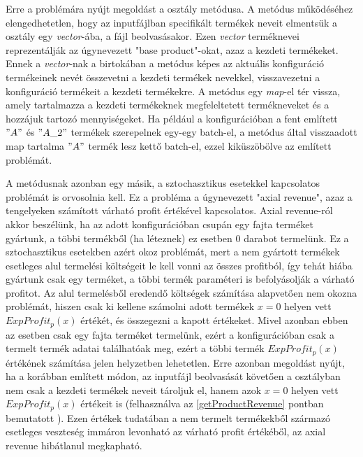 Erre a problémára nyújt megoldást a  osztály  metódusa.
A metódus működéséhez elengedhetetlen, hogy az inputfájlban specifikált termékek neveit elmentsük a  osztály egy \textit{vector}-ába, a fájl beolvasásakor.
Ezen \textit{vector} terméknevei reprezentálják az úgynevezett "base product"-okat, azaz a kezdeti termékeket.
Ennek a \textit{vector}-nak a birtokában a  metódus képes az aktuális konfiguráció termékeinek nevét összevetni a kezdeti termékek nevekkel, visszavezetni a konfiguráció termékeit a kezdeti termékekre.
A metódus egy \textit{map}-el tér vissza, amely tartalmazza a kezdeti termékeknek megfeleltetett termékneveket és a hozzájuk tartozó mennyiségeket.
Ha például a konfigurációban a fent említett $"A"$ és $"A\_2"$ termékek szerepelnek egy-egy batch-el, a metódus által visszaadott map tartalma $"A"$ termék lesz kettő batch-el, ezzel kiküszöbölve az említett problémát.

A  metódusnak azonban egy másik, a sztochasztikus esetekkel kapcsolatos problémát is orvosolnia kell.
Ez a probléma a úgynevezett "axial revenue", azaz a tengelyeken számított várható profit értékével kapcsolatos.
Axial revenue-ról akkor beszélünk, ha az adott konfigurációban csupán egy fajta terméket gyártunk, a többi termékből (ha léteznek) ez esetben 0 darabot termelünk.
Ez a sztochasztikus esetekben azért okoz problémát, mert a nem gyártott termékek esetleges alul termelési költségeit le kell vonni az összes profitból, így tehát hiába gyártunk csak egy terméket, a többi termék paraméteri is befolyásolják a várható profitot.
Az alul termelésből eredendő költségek számítása alapvetően nem okozna problémát, hiszen csak ki kellene számolni adott termékek $x=0$ helyen vett $ExpProfit_p(x)$ értékét, és összegezni a kapott értékeket.
Mivel azonban ebben az esetben csak egy fajta terméket termelünk, ezért a konfigurációban csak a termelt termék adatai találhatóak meg, ezért a többi termék $ExpProfit_p(x)$ értékének számítása jelen helyzetben lehetetlen.
Erre azonban megoldást nyújt, ha a korábban említett módon, az inputfájl beolvasását követően a  osztályban nem csak a kezdeti termékek neveit tároljuk el, hanem azok $x=0$ helyen vett $ExpProfit_p(x)$ értékeit is (felhasználva az \ref{getProductRevenue} pontban bemutatott ).
Ezen értékek tudatában a nem termelt termékekből származó esetleges veszteség immáron levonható az várható profit értékéből, az axial revenue hibátlanul megkapható.

